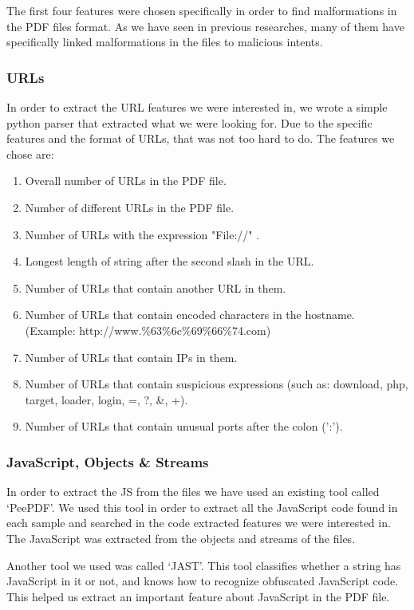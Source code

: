 \documentclass{article}
\begin{document}
\indent The first four features were chosen specifically in order to find malformations in the PDF files format. As we have seen in previous researches, many of them have specifically linked malformations in the files to malicious intents.

\subsubsection{URLs}
\indent	In order to extract the URL features we were interested in, we wrote a simple python parser that extracted what we were looking for. Due to the specific features and the format of URLs, that was not too hard to do. The features we chose are:

\begin{enumerate}
	\item Overall number of URLs in the PDF file.
	\item Number of different URLs in the PDF file.
	\item Number of URLs with the expression "File://" .
	\item Longest length of string after the second slash in the URL.
	\item Number of URLs that contain another URL in them.
	\item Number of URLs that contain encoded characters in the hostname. 
	\newline(Example: http://www.\%63\%6c\%69\%66\%74.com)
	\item Number of URLs that contain IPs in them.
	\item Number of URLs that contain suspicious expressions (such as: download, php, target, loader, login, =, ?, \&, +).
	\item Number of URLs that contain unusual ports after the colon (':').
\end{enumerate}

\subsubsection{JavaScript, Objects \& Streams}
\indent	In order to extract the JS from the files we have used an existing tool called ‘PeePDF’. We used this tool in order to extract all the JavaScript code found in each sample and searched in the code extracted features we were interested in. The JavaScript was extracted from the objects and streams of the files. 

\indent	Another tool we used was called ‘JAST’. This tool classifies whether a string has JavaScript in it or not, and knows how to recognize obfuscated JavaScript code. This helped us extract an important feature about JavaScript in the PDF file.
\end{document}
